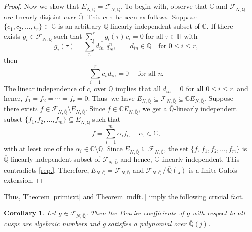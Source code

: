 \documentclass[11pt, reqno]{amsart}
\newtheorem{corollary}[theorem]{Corollary}
\begin{document}
\begin{proof}
Now we show that $E_{N,\overline{\mathbb{Q}}}= \mathcal{F}_{N,\overline{\mathbb{Q}}}$. To begin with, observe that $\mathbb{C}$ and $\mathcal{F}_{N,\overline{\mathbb{Q}}}$ are linearly disjoint over $\overline{\mathbb{Q}}$. This can be seen as follows. Suppose $\{c_1,c_2,\ldots,c_r\}\subset \mathbb{C}$ is an arbitrary $\overline{\mathbb{Q}}$-linearly independent subset of $\mathbb{C}$. If there exists $g_i \in \mathcal{F}_{N,\overline{\mathbb{Q}}}$ such that $\sum_{i=1}^r g_i(\tau) \, c_i = 0$ for all $\tau \in \mathbb{H}$ with
$$g_i(\tau)=\sum_n d_{i n} \, \, q_N^n, \qquad d_{in} \in \overline{\mathbb{Q}} \quad \text{for }0\leq i\leq r,$$
then $$\sum_{i=1}^rc_i\,d_{i n}=0\quad \text{ for all } n.$$ The linear independence of $c_i$ over $\overline{\mathbb{Q}}$ implies that all $d_{i n}=0$ for all $0\leq i\leq r$, and hence, $f_1=f_2=\cdots=f_r=0$. Thus, we have $E_{N,\overline{\mathbb{Q}}}\subseteq \mathcal{F}_{N,\overline{\mathbb{Q}}} \subseteq \mathbb{C}E_{N,\overline{\mathbb{Q}}}.$ Suppose there exists $f\in \mathcal{F}_{N,\overline{\mathbb{Q}}}\setminus E_{N,\overline{\mathbb{Q}}}$. Since $f \in \mathbb{C}E_{N,\overline{\mathbb{Q}}}$, we get a $\overline{\mathbb{Q}}$-linearly independent subset $\{f_1,f_2,\ldots,f_m\}\subseteq E_{N,\overline{\mathbb{Q}}}$ such that 
\begin{equation}\label{rep.}
  f=\sum_{i=1}^m \alpha_i f_i, \quad \alpha_i\in \mathbb{C},  
\end{equation}
with at least one of the $\alpha_i \in \mathbb{C} \setminus \overline{\mathbb{Q}}$. Since $E_{N,\overline{\mathbb{Q}}}\subseteq \mathcal{F}_{N,\overline{\mathbb{Q}}}$, the set $\{f, \,f_1,f_2,\ldots,f_m\}$ is $\overline{\mathbb{Q}}$-linearly independent subset of $\mathcal{F}_{N,\overline{\mathbb{Q}}}$ and hence, $\mathbb{C}$-linearly independent. This contradicts \eqref{rep.}. Therefore, $E_{N,\overline{\mathbb{Q}}}= \mathcal{F}_{N,\overline{\mathbb{Q}}}$ and $\mathcal{F}_{N,\overline{\mathbb{Q}}} \, / \, \overline{\mathbb{Q}}(j)$ is a finite Galois extension.
\end{proof}

Thus, Theorem \ref{primiext} and Theorem \ref{mdft..} imply the following crucial fact.
\begin{corollary}\label{cor-main-mdf}
Let $g \in \mathcal{F}_{N,\overline{\mathbb{Q}}}$. Then the Fourier coefficients of $g$ with respect to all cusps are algebraic numbers and $g$ satisfies a polynomial over $\overline{\mathbb{Q}}(j)$. 
\end{corollary}
\end{document}
